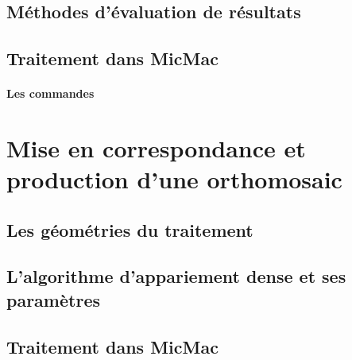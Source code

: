 \documentclass[11pt,a4paper,oneside]{book}
\begin{document}
\section{Méthodes d’évaluation de résultats}



\section{Traitement dans MicMac}



\subsubsection{Les commandes}

\chapter{Mise en correspondance et production d'une orthomosaic}

\section{Les géométries du traitement}
\section{L’algorithme d'appariement dense et ses paramètres}
\section{Traitement dans MicMac}
\end{document}
